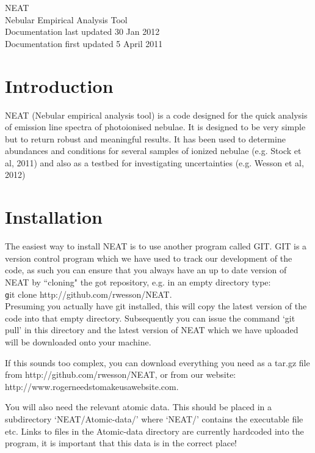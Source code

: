 \documentclass[11pt,a4paper]{article}
\begin{document}
\begin{center}
{\Huge NEAT}\\
\vspace{3cm}
{\huge Nebular Empirical Analysis Tool}\\
\vspace{3cm}
{\large Documentation last updated 30 Jan 2012}\\
{\large Documentation first updated 5 April 2011}
\end{center}

\newpage

\section{Introduction}

NEAT (Nebular empirical analysis tool) is a code designed for the quick analysis of emission line spectra of photoionised nebulae.  It is designed to be very simple but to return robust and meaningful results. It has been used to determine abundances and conditions for several samples of ionized nebulae (e.g. Stock et al, 2011) and also as a testbed for investigating uncertainties (e.g. Wesson et al, 2012)

\section{Installation}

The easiest way to install {\sc NEAT} is to use another program called {\sc GIT}. {\sc GIT} is a version control program which we have used to track our development of the code, as such you can ensure that you always have an up to date version of {\sc NEAT} by ``cloning" the got repository, e.g. in an empty directory type:
\\

{\texttt git clone http://github.com/rwesson/NEAT}.
\\

 Presuming you actually have {\sc git} installed, this will copy the latest version of the code into that empty directory. Subsequently you can issue the command `git pull' in this directory and the latest version of {\sc NEAT} which we have uploaded will be downloaded onto your machine.

If this sounds too complex, you can download everything you need as a tar.gz file from http://github.com/rwesson/NEAT, or from our website: http://www.rogerneedstomakeusawebsite.com.

You will also need the relevant atomic data\footnotemark.   This should be placed in a subdirectory `NEAT/Atomic-data/' where `NEAT/' contains the executable file etc. Links to files in the Atomic-data directory are currently hardcoded into the program, it is important that this data is in the correct place!
\end{document}
